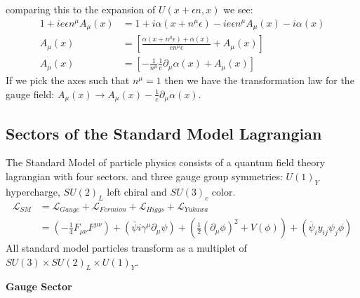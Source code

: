 comparing this to the expansion of $U(x+\epsilon n, x)$ we see:
\begin{align*}
1 + ie\epsilon n^\mu A_\mu (x) &= 1 + i \alpha (x+n^\mu\epsilon ) - ie \epsilon n^\mu A_\mu(x) - i\alpha(x)\\
A_\mu(x) &=  \left [ \frac{\alpha(x+n^\mu\epsilon) + \alpha(x)}{en^\mu \epsilon} + A_\mu(x) \right] \\
A_\mu(x) &=  \left [ -\frac{1}{n^\mu}\frac{1}{e}\partial_\mu \alpha(x) + A_\mu(x) \right]
\end{align*}
If we pick the axes such that $n^\mu = 1$ then we have the transformation law for the gauge field: $A_\mu(x) \rightarrow A_\mu(x) - \frac{1}{e} \partial_\mu \alpha(x)$.



\subsection{Sectors of the Standard Model Lagrangian}
The Standard Model of particle physics consists of a quantum field theory lagrangian with four sectors. and three gauge group symmetries: $U(1)_Y$ hypercharge, 
$SU(2)_L$ left chiral and $SU(3)_c$ color. 
\begin{align*}
\mathcal{L}_{SM} &= \mathcal{L}_{Gauge} + \mathcal{L}_{Fermion} + \mathcal{L}_{Higgs} + \mathcal{L}_{Yukawa}\\
&=\left(-\frac{1}{4} F_{\mu\nu}F^{\mu\nu} \right )
  + \left (\bar\psi i\gamma^\mu \partial_\mu \psi \right) +
 \left(\frac{1}{2}(\partial_\mu \phi)^2 + V(\phi) \right) + \left(\bar \psi_i y_{ij} \psi_j \phi \right ) 
\end{align*}
All standard model particles transform as a multiplet of $SU(3) \times SU(2)_L \times U(1)_Y$.

\textbf{Gauge Sector}

